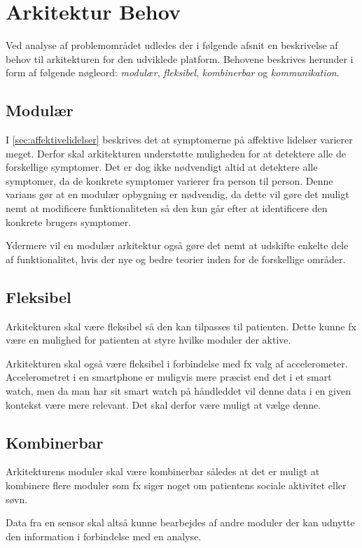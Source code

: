 \section{Arkitektur Behov}\label{arkitekturkrav}
Ved analyse af problemområdet udledes der i følgende afsnit en beskrivelse af behov til arkitekturen for den udviklede platform.
Behovene beskrives herunder i form af følgende nøgleord: \textit{modulær}, \textit{fleksibel}, \textit{kombinerbar} og \textit{kommunikation}.

\subsection{Modulær}
I \cref{sec:affektivelidelser} beskrives det at symptomerne på affektive lidelser varierer meget.
Derfor skal arkitekturen understøtte muligheden for at detektere alle de forskellige symptomer.
Det er dog ikke nødvendigt altid at detektere alle symptomer, da de konkrete symptomer varierer fra person til person.
Denne varians gør at en modulær opbygning er nødvendig, da dette vil gøre det muligt nemt at modificere funktionaliteten så den kun går efter at identificere den konkrete brugers symptomer.

Ydermere vil en modulær arkitektur også gøre det nemt at udskifte enkelte dele af funktionalitet, hvis der nye og bedre teorier inden for de forskellige områder.

\subsection{Fleksibel}
Arkitekturen skal være fleksibel så den kan tilpasses til patienten.
Dette kunne fx være en mulighed for patienten at styre hvilke moduler der aktive.

Arkitekturen skal også være fleksibel i forbindelse med fx valg af accelerometer.
Accelerometret i en smartphone er muligvis mere præcist end det i et smart watch, men da man har sit smart watch på håndleddet vil denne data i en given kontekst være mere relevant.
Det skal derfor være muligt at vælge denne.

\subsection{Kombinerbar}%
Arkitekturens moduler skal være kombinerbar således at det er muligt at kombinere flere moduler som fx siger noget om patientens sociale aktivitet eller søvn.

Data fra en sensor skal altså kunne bearbejdes af andre moduler der kan udnytte den information i forbindelse med en analyse.

